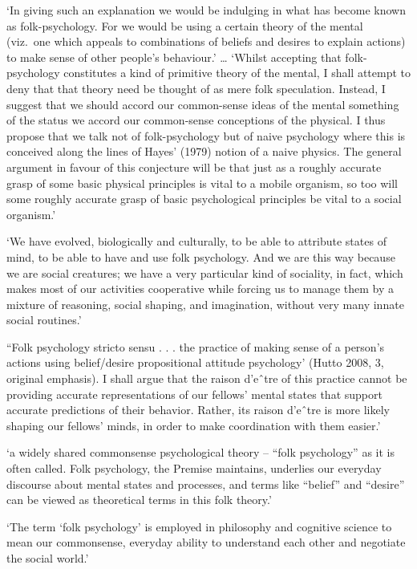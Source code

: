 \documentclass[12pt,\papersize]{extarticle}
\begin{document}
`In giving such an explanation we would be indulging in what has become known as folk-psychology. For we would be using a certain theory of the mental (viz.~one which appeals to combinations of beliefs and desires to explain actions) to make sense of other people's behaviour.' \citep[p.~139]{clark:1987_folk} \ldots{} `Whilst accepting that folk-psychology constitutes a kind of primitive theory of the mental, I shall attempt to deny that that theory need be thought of as mere folk speculation. Instead, I suggest that we should accord our common-sense ideas of the mental something of the status we accord our common-sense conceptions of the physical. I thus propose that we talk not of folk-psychology but of naive psychology where this is conceived along the lines of Hayes' (1979) notion of a naive physics. The general argument in favour of this conjecture will be that just as a roughly accurate grasp of some basic physical principles is vital to a mobile organism, so too will some roughly accurate grasp of basic psychological principles be vital to a social organism.' \citep[p.~140]{clark:1987_folk}

`We have evolved, biologically and culturally, to be able to attribute states of mind, to be able to have and use folk psychology. And we are this way because we are social creatures; we have a very particular kind of sociality, in fact, which makes most of our activities cooperative while forcing us to manage them by a mixture of reasoning, social shaping, and imagination, without very many innate social routines.' \citep[p.~119]{Morton:1996gu}

``Folk psychology stricto sensu . . . the practice of making sense of a person's actions using belief/desire propositional attitude psychology' (Hutto 2008, 3, original emphasis). I shall argue that the raison d'eˆtre of this practice cannot be providing accurate representations of our fellows' mental states that support accurate predictions of their behavior. Rather, its raison d'eˆtre is more likely shaping our fellows' minds, in order to make coordination with them easier.' \citep[p.~194]{zawidzki:2008_function}

`a widely shared commonsense psychological theory -- ``folk psychology'' as it is often called. Folk psychology, the Premise maintains, underlies our everyday discourse about mental states and processes, and terms like ``belief'' and ``desire'' can be viewed as theoretical terms in this folk theory.' \citep{stich:1996_deconstructing}

`The term `folk psychology' is employed in philosophy and cognitive science to mean our commonsense, everyday ability to understand each other and negotiate the social world.' \citep[p.~31]{ratcliffe:2006_folk}
\end{document}

